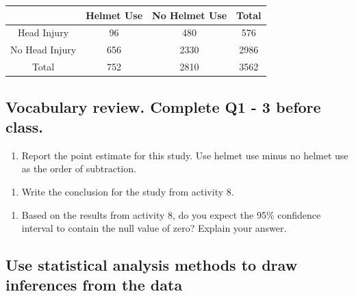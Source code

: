 \documentclass[
]{report}
\providecommand{\tightlist}{%
  \setlength{\itemsep}{0pt}\setlength{\parskip}{0pt}}
\begin{document}
\begin{longtable}[]{@{}cccc@{}}
\toprule
& Helmet Use & No Helmet Use & Total\tabularnewline
\midrule
\endhead
Head Injury & 96 & 480 & 576\tabularnewline
No Head Injury & 656 & 2330 & 2986\tabularnewline
Total & 752 & 2810 & 3562\tabularnewline
\bottomrule
\end{longtable}

\hypertarget{vocabulary-review.-complete-q1---3-before-class.}{%
\subsection*{Vocabulary review. Complete Q1 - 3 before class.}\label{vocabulary-review.-complete-q1---3-before-class.}}

\begin{enumerate}
\def\labelenumi{\arabic{enumi}.}
\tightlist
\item
  Report the point estimate for this study. Use helmet use minus no helmet use as the order of subtraction.
\end{enumerate}

\vspace{0.4in}

\begin{enumerate}
\def\labelenumi{\arabic{enumi}.}
\setcounter{enumi}{1}
\tightlist
\item
  Write the conclusion for the study from activity 8.
\end{enumerate}

\vspace{1in}

\begin{enumerate}
\def\labelenumi{\arabic{enumi}.}
\setcounter{enumi}{2}
\tightlist
\item
  Based on the results from activity 8, do you expect the 95\% confidence interval to contain the null value of zero? Explain your answer.
\end{enumerate}

\vspace{1in}

\hypertarget{use-statistical-analysis-methods-to-draw-inferences-from-the-data}{%
\subsection*{Use statistical analysis methods to draw inferences from the data}\label{use-statistical-analysis-methods-to-draw-inferences-from-the-data}}
\end{document}
